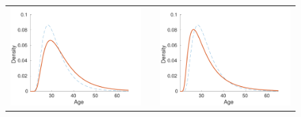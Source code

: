 \documentclass[11pt]{article}
\theoremstyle{definition} %
\begin{document}
\begin{figure}[h!]
\begin{tabular}{c c c}
\includegraphics[scale=0.4]{CS3.pdf} && \includegraphics[scale=0.4]{CS4.pdf} 
\end{tabular}

\end{figure}
\end{document}
